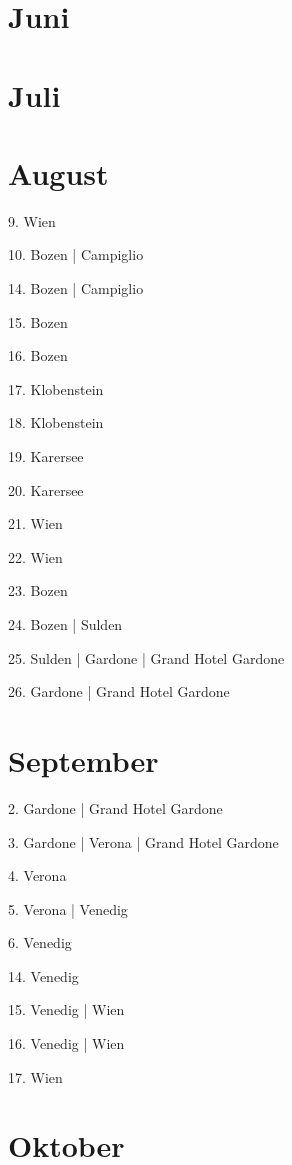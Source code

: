 \documentclass[twoside=false,titlepage=false,open=any, parskip=never, fontsize=10pt, headings=small, chapterprefix=false, appendixprefix=false, DIV=15]{scrbook}
\begin{document}
\begin{multicols}{3}
            \section*{Juni}
            \section*{Juli}
            \section*{August}
            9. Wien\par
            10. Bozen | Campiglio\par
            14. Bozen | Campiglio\par
            15. Bozen\par
            16. Bozen\par
            17. Klobenstein\par
            18. Klobenstein\par
            19. Karersee\par
            20. Karersee\par
            21. Wien\par
            22. Wien\par
            23. Bozen\par
            24. Bozen | Sulden\par
            25. Sulden | Gardone | Grand Hotel Gardone\par
            26. Gardone | Grand Hotel Gardone\par
            \section*{September}
            2. Gardone | Grand Hotel Gardone\par
            3. Gardone | Verona | Grand Hotel Gardone\par
            4. Verona\par
            5. Verona | Venedig\par
            6. Venedig\par
            14. Venedig\par
            15. Venedig | Wien\par
            16. Venedig | Wien\par
            17. Wien\par
            \section*{Oktober}

\end{multicols}
\end{document}
